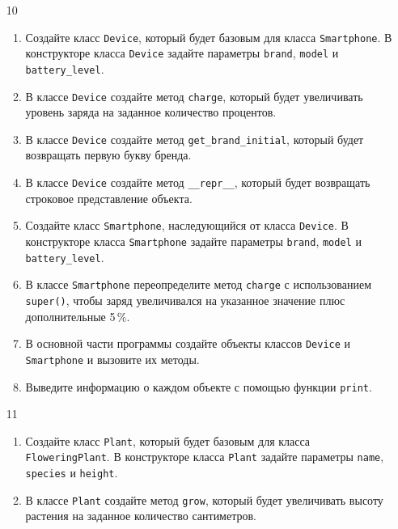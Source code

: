 \begin{enumerate}
\item[10] 
\begin{enumerate}
    \item Создайте класс \texttt{Device}, который будет базовым для класса \texttt{Smartphone}. В конструкторе класса \texttt{Device} задайте параметры \texttt{brand}, \texttt{model} и \texttt{battery\_level}.
    
    \item В классе \texttt{Device} создайте метод \texttt{charge}, который будет увеличивать уровень заряда на заданное количество процентов.
    
    \item В классе \texttt{Device} создайте метод \texttt{get\_brand\_initial}, который будет возвращать первую букву бренда.
    
    \item В классе \texttt{Device} создайте метод \texttt{\_\_repr\_\_}, который будет возвращать строковое представление объекта.
    
    \item Создайте класс \texttt{Smartphone}, наследующийся от класса \texttt{Device}. В конструкторе класса \texttt{Smartphone} задайте параметры \texttt{brand}, \texttt{model} и \texttt{battery\_level}.
    
    \item В классе \texttt{Smartphone} переопределите метод \texttt{charge} с использованием \texttt{super()}, чтобы заряд увеличивался на указанное значение плюс дополнительные 5\,\%.
    
    \item В основной части программы создайте объекты классов \texttt{Device} и \texttt{Smartphone} и вызовите их методы.
    
    \item Выведите информацию о каждом объекте с помощью функции \texttt{print}.
\end{enumerate}

\item[11] 
\begin{enumerate}
    \item Создайте класс \texttt{Plant}, который будет базовым для класса \texttt{FloweringPlant}. В конструкторе класса \texttt{Plant} задайте параметры \texttt{name}, \texttt{species} и \texttt{height}.
    
    \item В классе \texttt{Plant} создайте метод \texttt{grow}, который будет увеличивать высоту растения на заданное количество сантиметров.
    

\end{enumerate}
\end{enumerate}
